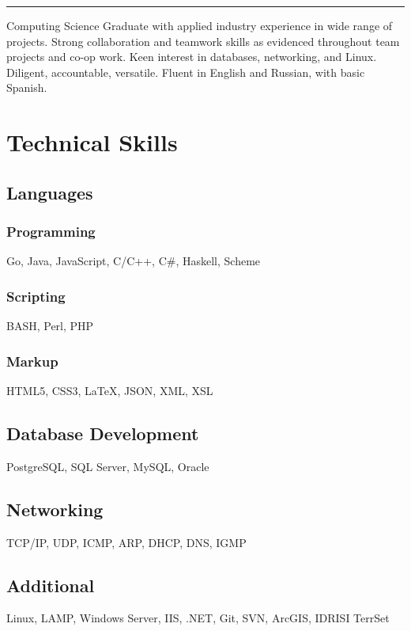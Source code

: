 \documentclass{ik-resume}
\begin{document}
\pagestyle{main}
\thispagestyle{empty}



\noindent\rule{\textwidth}{1pt}

\vspace{1em}
\noindent Computing Science Graduate with applied industry experience in wide range of projects.
Strong collaboration and teamwork skills as evidenced throughout team projects and co-op work.
Keen interest in databases, networking, and Linux.
Diligent, accountable, versatile.
Fluent in English and Russian, with basic Spanish.

\section{Technical Skills}

\subsection{Languages}

\subsubsection{Programming}
Go, Java, JavaScript, C/C++, C\#, Haskell, Scheme

\subsubsection{Scripting}
BASH, Perl, PHP

\subsubsection{Markup}
HTML5, CSS3, {\LaTeX}, JSON, XML, XSL

\subsection{Database Development}
PostgreSQL, SQL Server, MySQL, Oracle

\subsection{Networking}
TCP/IP, UDP, ICMP, ARP, DHCP, DNS, IGMP

\subsection{Additional}
Linux, LAMP, Windows Server, IIS, .NET, Git, SVN, ArcGIS, IDRISI TerrSet
\end{document}
